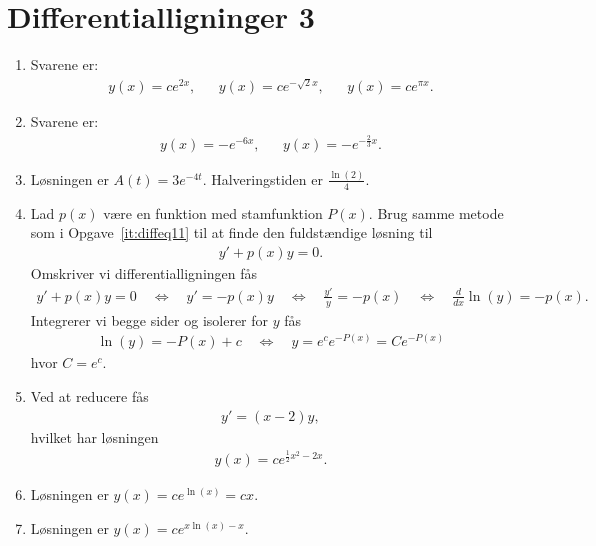 \section{Differentialligninger 3}
\begin{enumerate}
	
	\item Svarene er:
	\begin{align*}
	y(x)=ce^{2x},&& y(x)=ce^{-\sqrt{2}x} ,&& y(x)=ce^{\pi x}.
	\end{align*}
	
	
	\item Svarene er:
	\begin{align*}
	y(x)=-e^{-6x},&& y(x)=-e^{-\frac{2}{3}x}.
	\end{align*}

	

	
	
	
	\item \label{it:diffeq31ans} Løsningen er $A(t)=3e^{-4t}$. Halveringstiden er $\frac{\ln(2)}{4}$.

	
	\item \label{it:diffeq12ans} Lad $p(x)$ være en funktion med stamfunktion $P(x)$. Brug samme metode som i Opgave~\ref{it:diffeq11} til at finde den fuldstændige løsning til
	\begin{align*}
	y'+p(x)y=0.
	\end{align*}
	Omskriver vi differentialligningen fås
	\begin{align*}
	y'+p(x)y=0\quad \Leftrightarrow\quad y'=-p(x)y\quad\Leftrightarrow\quad \frac{y'}{y}=-p(x)\quad\Leftrightarrow\quad \frac{d}{dx}\ln(y) =-p(x).
	\end{align*}
	Integrerer vi begge sider og isolerer for $y$ fås
	\begin{align*}
	\ln(y)=-P(x)+c\quad \Leftrightarrow\quad y=e^c e^{-P(x)}=Ce^{-P(x)}
	\end{align*}
	hvor $C=e^c$.
	
	\item Ved at reducere fås
	\begin{align*}
	y'=(x-2)y,
	\end{align*}
	hvilket har løsningen
	\begin{align*}
	y(x)=ce^{\frac{1}{2}x^2-2x}.
	\end{align*}


	\item Løsningen er $y(x)=ce^{\ln(x)}=cx$.

	\item Løsningen er $y(x)=ce^{x\ln(x)-x}$.


\end{enumerate}
